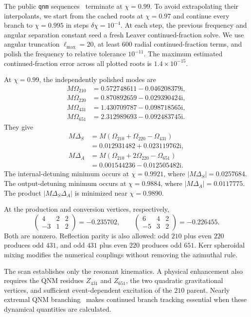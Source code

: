 \documentclass[
 reprint,
 amsmath,amssymb,
 aps,
 prl,
 superscriptaddress,
 nofootinbib
]{revtex4-2}
\newcommand{\Om}{\Omega}
\newcommand{\ii}{\mathrm{i}}
\begin{document}
The public \texttt{qnm} sequences~\cite{Stein2019} terminate at
\(\chi=0.99\). To avoid extrapolating their interpolants, we start from the
cached roots at \(\chi=0.97\) and continue every branch to \(\chi=0.995\) in
steps \(\delta\chi=10^{-4}\). At each step, the previous frequency and
angular separation constant seed a fresh Leaver continued-fraction solve.
We use angular truncation \(\ell_{\max}=20\), at least \(600\) radial
continued-fraction terms, and polish the frequency to relative tolerance
\(10^{-11}\). The maximum estimated continued-fraction error across all
plotted roots is \(1.4\times10^{-15}\).

At \(\chi=0.99\), the independently polished modes are
\begin{align}
M\Om_{210}&=0.572748611-0.046208379\ii,\\
M\Om_{220}&=0.870892659-0.029390424\ii,\\
M\Om_{431}&=1.430709787-0.098718565\ii,\\
M\Om_{651}&=2.312989693-0.092483745\ii.
\label{eqS:frequencies}
\end{align}
They give
\begin{align}
M\Delta_S
&=M(\Om_{210}+\Om_{220}-\Om_{431})\nonumber\\
&=0.012931482+0.023119762\ii,\\
M\Delta_A
&=M(\Om_{210}+2\Om_{220}-\Om_{651})\nonumber\\
&=0.001544236-0.012505482\ii.
\label{eqS:detunings}
\end{align}
The internal-detuning minimum occurs at
\(\chi=0.9921\), where \(|M\Delta_S|=0.0257684\).
The output-detuning minimum occurs at
\(\chi=0.9884\), where \(|M\Delta_A|=0.0117775\).
The product \(|M\Delta_S\Delta_A|\) is minimized near \(\chi=0.9890\).

At the production and conversion vertices, respectively,
\begin{equation}
\begin{pmatrix}4&2&2\\-3&1&2\end{pmatrix}
=-0.235702,\qquad
\begin{pmatrix}6&4&2\\-5&3&2\end{pmatrix}
=-0.226455.
\end{equation}
Both are nonzero. Reflection parity is also allowed:
odd \(210\) plus even \(220\) produces odd \(431\), and odd \(431\) plus
even \(220\) produces odd \(651\). Kerr spheroidal mixing modifies the
numerical couplings without removing the azimuthal rule.

The scan establishes only the resonant kinematics. A physical enhancement also
requires the QNM residues \(Z_{431}\) and \(Z_{651}\), the two quadratic
gravitational vertices, and sufficient event-dependent excitation of the
\(210\) parent. Nearly extremal QNM branching~\cite{YangEtAl2013} makes
continued branch tracking essential when these dynamical quantities are
calculated.


\end{document}
